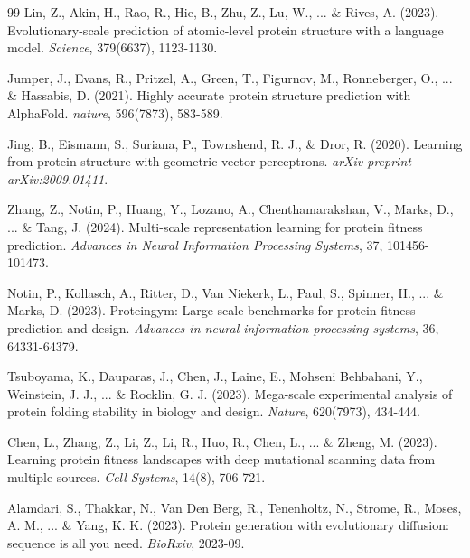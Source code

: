 \documentclass[12pt, a4paper]{article}
\begin{document}
\begin{thebibliography}{99}
Lin, Z., Akin, H., Rao, R., Hie, B., Zhu, Z., Lu, W., ... \& Rives, A. (2023). \newblock Evolutionary-scale prediction of atomic-level protein structure with a language model. \newblock \textit{Science}, 379(6637), 1123-1130.


Jumper, J., Evans, R., Pritzel, A., Green, T., Figurnov, M., Ronneberger, O., ... \& Hassabis, D. (2021). \newblock Highly accurate protein structure prediction with AlphaFold. \newblock \textit{nature}, 596(7873), 583-589.


Jing, B., Eismann, S., Suriana, P., Townshend, R. J., \& Dror, R. (2020). \newblock Learning from protein structure with geometric vector perceptrons. \newblock \textit{arXiv preprint arXiv:2009.01411}.


Zhang, Z., Notin, P., Huang, Y., Lozano, A., Chenthamarakshan, V., Marks, D., ... \& Tang, J. (2024). \newblock Multi-scale representation learning for protein fitness prediction. \newblock \textit{Advances in Neural Information Processing Systems}, 37, 101456-101473.


Notin, P., Kollasch, A., Ritter, D., Van Niekerk, L., Paul, S., Spinner, H., ... \& Marks, D. (2023). \newblock Proteingym: Large-scale benchmarks for protein fitness prediction and design. \newblock \textit{Advances in neural information processing systems}, 36, 64331-64379.


Tsuboyama, K., Dauparas, J., Chen, J., Laine, E., Mohseni Behbahani, Y., Weinstein, J. J., ... \& Rocklin, G. J. (2023). \newblock Mega-scale experimental analysis of protein folding stability in biology and design. \newblock \textit{Nature}, 620(7973), 434-444.


Chen, L., Zhang, Z., Li, Z., Li, R., Huo, R., Chen, L., ... \& Zheng, M. (2023). \newblock Learning protein fitness landscapes with deep mutational scanning data from multiple sources. \newblock \textit{Cell Systems}, 14(8), 706-721.


Alamdari, S., Thakkar, N., Van Den Berg, R., Tenenholtz, N., Strome, R., Moses, A. M., ... \& Yang, K. K. (2023). \newblock Protein generation with evolutionary diffusion: sequence is all you need. \newblock \textit{BioRxiv}, 2023-09.



\end{thebibliography}
\end{document}
